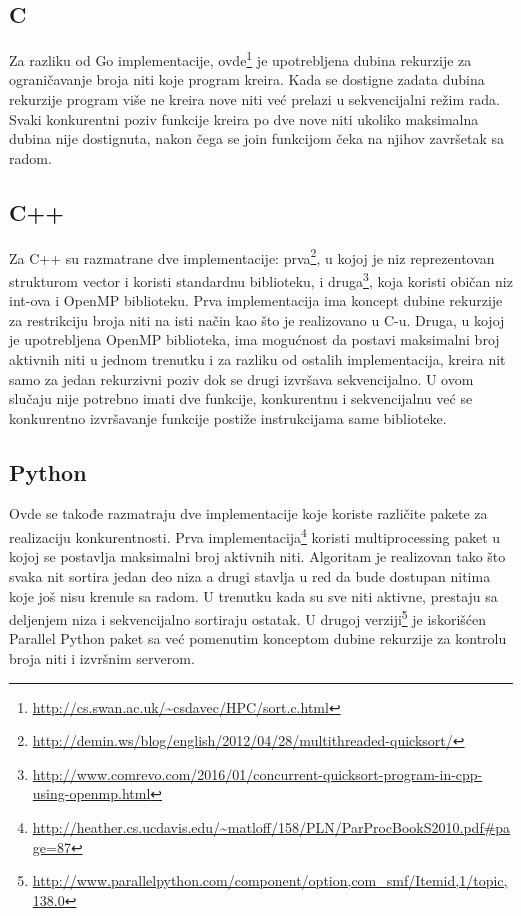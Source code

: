 \documentclass[12pt,oneside]{memoir}
\begin{document}
\subsection{C}
Za razliku od Go implementacije, ovde\footnote{\url{http://cs.swan.ac.uk/~csdavec/HPC/sort.c.html}} je upotrebljena dubina rekurzije za ograničavanje broja niti koje program kreira. Kada se dostigne zadata dubina rekurzije program više ne kreira nove niti već prelazi u sekvencijalni režim rada. Svaki konkurentni poziv funkcije kreira po dve nove niti ukoliko maksimalna dubina nije dostignuta, nakon čega se join funkcijom čeka na njihov završetak sa radom.

\subsection{C++}
Za C++ su razmatrane dve implementacije: prva\footnote{\url{http://demin.ws/blog/english/2012/04/28/multithreaded-quicksort/}}, u kojoj je niz reprezentovan strukturom vector i koristi standardnu biblioteku, i druga\footnote{\url{http://www.comrevo.com/2016/01/concurrent-quicksort-program-in-cpp-using-openmp.html}}, koja koristi običan niz int-ova i OpenMP biblioteku. 
Prva implementacija ima koncept dubine rekurzije za restrikciju broja niti na isti način kao što je realizovano u C-u. Druga, u kojoj je upotrebljena OpenMP biblioteka, ima mogućnost da postavi maksimalni broj aktivnih niti u jednom trenutku i za razliku od ostalih implementacija, kreira nit samo za jedan rekurzivni poziv dok se drugi izvršava sekvencijalno. U ovom slučaju nije potrebno imati dve funkcije, konkurentnu i sekvencijalnu već se konkurentno izvršavanje funkcije postiže instrukcijama same biblioteke. 

\subsection{Python}
Ovde se takođe razmatraju dve implementacije koje koriste različite pakete za realizaciju konkurentnosti. Prva implementacija\footnote{\url{http://heather.cs.ucdavis.edu/~matloff/158/PLN/ParProcBookS2010.pdf\#page=87}} koristi multiprocessing paket u kojoj se postavlja maksimalni broj aktivnih niti. Algoritam je realizovan tako što svaka nit sortira jedan deo niza a drugi stavlja u red da bude dostupan nitima koje još nisu krenule sa radom. U trenutku kada su sve niti aktivne, prestaju sa deljenjem niza i sekvencijalno sortiraju ostatak. U drugoj verziji\footnote{\url{http://www.parallelpython.com/component/option,com_smf/Itemid,1/topic,138.0}} je iskorišćen Parallel Python paket sa već pomenutim konceptom dubine rekurzije za kontrolu broja niti i izvršnim serverom. 
\end{document}
